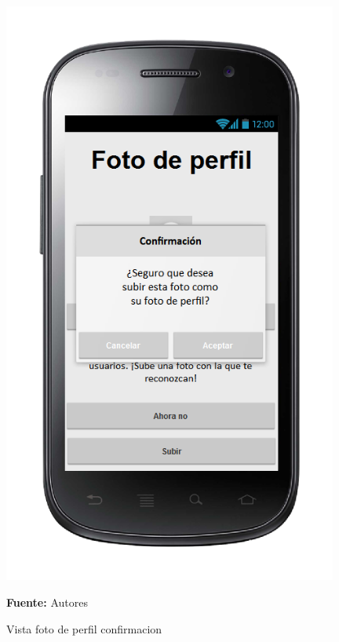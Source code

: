 \begin{figure}[!htb]
  \begin{center}
\includegraphics[width=11cm]{./imagenes/UI/Usuarios/foto_de_perfil_confirmacion.png}
    \caption{Vista foto de perfil confirmacion}
    \label{fig:Vista_foto_de_perfil_confirmacion}
    \textbf{Fuente:}  Autores
  \end{center}
\end{figure}
